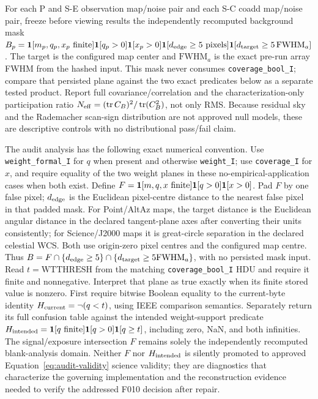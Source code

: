 \documentclass[11pt]{article}
\newcommand{\code}[1]{\nolinkurl{#1}}
\begin{document}
For each P and S-E observation map/noise pair and each S-C coadd map/noise pair,
freeze before viewing results the independently recomputed background mask
\(B_p={\bf1}[m_p,q_p,x_p\ \text{finite}]
{\bf1}[q_p>0]{\bf1}[x_p>0]{\bf1}[d_{\rm edge}\ge5\ \text{pixels}]
{\bf1}[d_{\rm target}\ge5\,\mathrm{FWHM}_a]\).  The target is the configured
map center and \(\mathrm{FWHM}_a\) is the exact pre-run array FWHM from the
hashed input.  This mask never consumes \code{coverage_bool_I}; compare that
persisted plane against the two exact predicates below as a separate tested
product.  Report full covariance/correlation and the characterization-only
participation ratio \(N_{\rm eff}=(\operatorname{tr}C_B)^2/
\operatorname{tr}(C_B^2)\), not only RMS.  Because residual sky and the
Rademacher scan-sign distribution are not approved null models, these are
descriptive controls with no distributional pass/fail claim.

The audit analysis has the following exact numerical convention.  Use
\code{weight_formal_I} for \(q\) when present and otherwise \code{weight_I}; use
\code{coverage_I} for \(x\), and require equality of the two weight planes in
these no-empirical-application cases when both exist.  Define
\(F={\bf1}[m,q,x\text{ finite}]{\bf1}[q>0]{\bf1}[x>0]\).  Pad \(F\) by one false
pixel; \(d_{\rm edge}\) is the Euclidean pixel-centre distance to the nearest
false pixel in that padded mask.  For Point/AltAz maps, the target distance is
the Euclidean angular distance in the declared tangent-plane axes after
converting their units consistently; for Science/J2000 maps it is great-circle
separation in the declared celestial WCS.  Both use origin-zero pixel centres
and the configured map centre.  Thus \(B=F\cap\{d_{\rm edge}\ge5\}\cap
\{d_{\rm target}\ge5\mathrm{FWHM}_a\}\), with no persisted mask input.
Read \(t=\mathrm{WTTHRESH}\) from the matching \code{coverage_bool_I} HDU and
require it finite and nonnegative.  Interpret that plane as true exactly when
its finite stored value is nonzero.  First require bitwise Boolean equality to
the current-byte identity \(H_{\rm current}=\neg(q<t)\), using IEEE comparison
semantics.  Separately return its full confusion table against the intended
weight-support predicate
\(H_{\rm intended}={\bf1}[q\text{ finite}]{\bf1}[q>0]{\bf1}[q\ge t]\),
including zero, NaN, and both infinities.  The signal/exposure intersection
\(F\) remains solely the independently recomputed blank-analysis domain.
Neither \(F\) nor \(H_{\rm intended}\) is silently promoted to approved
Equation~\eqref{eq:audit-validity} science validity; they are diagnostics that
characterize the governing implementation and the reconstruction evidence
needed to verify the addressed F010 decision after repair.
\end{document}
